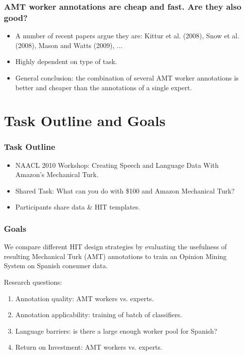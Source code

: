 \documentclass[10pt]{beamer}
\newenvironment{itemwide}%
{\begin{itemize}%
    \setlength{\itemsep}{5pt}%
    \setlength{\parskip}{5pt}}%
  {\end{itemize}}
\begin{document}
\begin{frame}
  \frametitle{AMT worker annotations are cheap and fast. Are they also good?}
	\begin{itemwide}
 	\item A number of recent papers argue they are: Kittur et al. (2008), Snow et al. (2008), Mason and Watts (2009), $\ldots$
	\item Highly dependent on type of task.
	\item General conclusion: the combination of several AMT worker annotations is better and cheaper than the annotations of a single expert.
	\end{itemwide}
\end{frame}

\section{Task Outline and Goals}

\begin{frame}
  \frametitle{Task Outline}
\begin{itemwide}
 \item NAACL 2010 Workshop: Creating Speech and Language Data With Amazon's Mechanical Turk.
 \item Shared Task: What can you do with \$100 and Amazon Mechanical Turk?
 \item Participants share data \& HIT templates.
\end{itemwide}

\end{frame}

\begin{frame}
  \frametitle{Goals}
We compare different HIT design strategies by evaluating the usefulness of resulting Mechanical Turk (AMT) annotations to train an Opinion Mining System on Spanish consumer data.\\

\vspace{1cm}

\begin{block}{Research questions:}
 \begin{enumerate}
 \item Annotation quality: AMT workers vs. experts.
 \item Annotation applicability: training of batch of classifiers.
 \item Language barriers: is there a large enough worker pool for Spanish?
 \item Return on Investment: AMT workers vs. experts.
\end{enumerate}
\end{block}

\end{frame}
\end{document}
